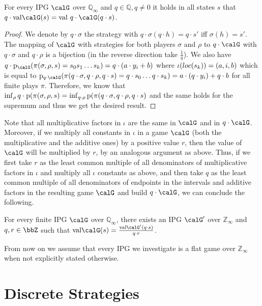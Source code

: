 \documentclass[fleqn,envcountsame]{LMCS}
\newcommand{\val}{\ensuremath{\mathrm{val}}}
\newcommand{\Qinf}{\ensuremath{\mathbb{Q}_{\infty}}}
\newcommand{\Zinf}{\ensuremath{\mathbb{Z}_{\infty}}}
\newcommand{\setQ}{\ensuremath{\mathbb{Q}}}
\begin{document}
\begin{lem} \label{mult_games}
For every IPG $\calG$ over $\Qinf$ and $q \in \setQ, q \neq 0$ it holds in all states
$s$ that $q \cdot \val \calG (s) = \val \  q \cdot \calG(q \cdot s)$.
\end{lem}

\begin{proof}
We denote by $q \cdot \sigma$ the strategy with 
$q \cdot \sigma(q \cdot h) = q \cdot s'$ iff $\sigma(h)= s'.$
The mapping of $\calG$ with strategies for both players $\sigma$ and $\rho$
to $q \cdot \calG$ with $q \cdot \sigma$ and $q \cdot \rho$ is a bijection 
(in the reverse direction take $\frac 1 q$). We also have 
$q \cdot \pay_{\calG} (\pi(\sigma, \rho, s)=s_0s_1 \ldots s_k) = q \cdot (a \cdot y_i + b)$
where $\iota(loc(s_k))=(a,i,b)$ which is equal to 
$\pay_{q \cdot \calG} (\pi(q \cdot \sigma, q \cdot \rho, q \cdot s)= q \cdot s_0 \ldots q \cdot s_k)= a \cdot (q \cdot y_i) + q \cdot b$
for all finite plays $\pi$. Therefore, we know that 
$\inf_{\rho} q \cdot \mathrm{p} (\pi(\sigma, \rho, s) = 
 \inf_{q \cdot \rho}\mathrm{p} (\pi(q \cdot \sigma, q \cdot \rho, q \cdot s)$ 
and the same holds for the supremum and thus we get the desired result.
\end{proof}

Note that all multiplicative factors in $\iota$ are the same in $\calG$ and
in $q \cdot \calG$. Moreover, if we multiply all constants in $\iota$ in a game
$\calG$ (both the multiplicative and the additive ones) by a positive value $r$,
then the value of $\calG$ will be multiplied by $r$, by an analogous argument as
above. Thus, if we first take $r$ as the least common multiple of all denominators
of multiplicative factors in $\iota$ and multiply all $\iota$ constants as above,
and then take $q$ as the least common multiple of all denominators of endpoints
in  the intervals and additive factors in the resulting game $\calG$ and build
$q \cdot \calG$, we can conclude the following.

\begin{cor} \label{mult_games_col}
For every finite IPG $\calG$ over $\Qinf$, there exists an IPG $\calG'$ over $\Zinf$ and
$q, r \in \bbZ$ such that $\val\calG(s) = \frac{\val\calG'(q \cdot s)}{q \cdot r}$.
\end{cor}

From now on we assume that every IPG we investigate is a flat game over $\Zinf$
when not explicitly stated otherwise. 


\section{Discrete Strategies} \label{sec_ds}
\end{document}
